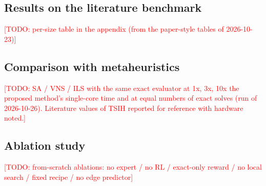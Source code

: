 \documentclass[preprint,review,12pt,authoryear]{elsarticle}
\newcommand{\todo}[1]{\textcolor{red}{[TODO: #1]}}
\begin{document}
\subsection{Results on the literature benchmark}
\begin{table}[t]\centering\small
\caption{Real529 results by instance set. UB: mean makespan; $\Delta$: mean gap to BKS (\%); BS/NBS:
instances reaching / improving the BKS; time: mean wall seconds per instance.}
\label{tab:real529}
\end{table}
\todo{per-size table in the appendix (from the paper-style tables of 2026-10-23)}

\subsection{Comparison with metaheuristics}
\todo{SA / VNS / ILS with the same exact evaluator at 1x, 3x, 10x the proposed method's single-core time
and at equal numbers of exact solves (run of 2026-10-26). Literature values of
TSIH \citep{li2025exact} reported for reference with hardware noted.}

\subsection{Ablation study}
\todo{from-scratch ablations: no expert / no RL / exact-only reward / no local search / fixed recipe / no edge predictor}
\end{document}
